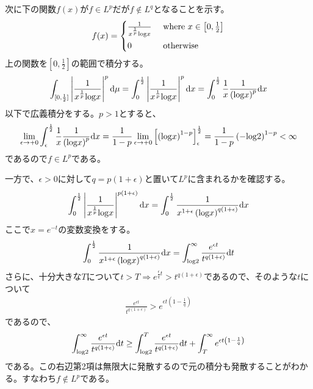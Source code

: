 \documentclass{article}
\begin{document}
次に下の関数$f(x)$が$f\in L^p$だが$f\notin L^q$となることを示す。
\begin{align*}
	f(x) = \begin{cases}
	\frac{1}{x^{\frac{1}{p}} {\rm log}x}\ &\text{where}\ x\in \left[0,\frac{1}{2} \right]\\[8pt]
	0\ &\text{otherwise}
	\end{cases}
\end{align*}
上の関数を$\left[0,\frac{1}{2} \right]$の範囲で積分する。
\begin{align*}
	\int_{[0,{\frac{1}{2}}]} \left| \frac{1}{x^{\frac{1}{p}} {\rm log}x} \right|^{p}\mathrm{d}\mu = \int_0^{\frac{1}{2}} \left| \frac{1}{x^{\frac{1}{p}} {\rm log}x} \right|^{p}\mathrm{d}x = \int_0^{\frac{1}{2}} \frac{1}{x} \frac{1}{\left( {\rm log}x \right)^p} \mathrm{d}x
\end{align*}
以下で広義積分をする。$p > 1$とすると、
\begin{align*}
	\lim_{\epsilon \to +0} \int_{\epsilon}^{\frac{1}{2}}  \frac{1}{x} \frac{1}{\left( {\rm log}x \right)^p} \mathrm{d}x = \frac{1}{1-p} \lim_{\epsilon \to +0} \left[ \left( {\rm log}x \right)^{1-p} \right]_{\epsilon}^{\frac{1}{2}} = \frac{1}{1-p} \left( -{\rm log}2 \right)^{1-p} < \infty
\end{align*}
であるので$f \in L^p$である。

一方で、$\epsilon > 0$に対して$q = p(1 + \epsilon)$と置いて$L^p$に含まれるかを確認する。
\begin{align*}
	\int_0^{\frac{1}{2}} \left| \frac{1}{x^{\frac{1}{p}} {\rm log}x} \right|^{p(1 + \epsilon)}\mathrm{d}x = \int_0^{\frac{1}{2}} \frac{1}{x^{1+\epsilon} \left( {\rm log}x \right)^{q(1 + \epsilon)}} \mathrm{d}x
\end{align*}
ここで$x = e^{-t}$の変数変換をする。
\begin{align*}
	\int_0^{\frac{1}{2}} \frac{1}{x^{1+\epsilon} \left( {\rm log}x \right)^{q(1 + \epsilon)}} \mathrm{d}x = \int_{{\rm log}2}^{\infty} \frac{e^{\epsilon t}}{t^{q(1 + \epsilon)}} \mathrm{d}t
\end{align*}
さらに、十分大きな$T$について$t > T \Rightarrow e^{\frac{\epsilon}{q}t} > t^{q(1 + \epsilon)}$であるので、そのような$t$について
\begin{align*}
	\frac{e^{\epsilon t}}{t^{q(1 + \epsilon)}} > e^{\epsilon t \left(1 - \frac{1}{q}\right)}
\end{align*}
であるので、
\begin{align*}
	\int_{{\rm log}2}^{\infty} \frac{e^{\epsilon t}}{t^{q(1 + \epsilon)}} \mathrm{d}t \geq \int_{{\rm log}2}^T \frac{e^{\epsilon t}}{t^{q(1 + \epsilon)}} \mathrm{d}t + \int_T^{\infty} e^{\epsilon t \left(1 - \frac{1}{q}\right)}
\end{align*}
である。この右辺第2項は無限大に発散するので元の積分も発散することがわかる。すなわち$f\notin L^p$である。
\end{document}
